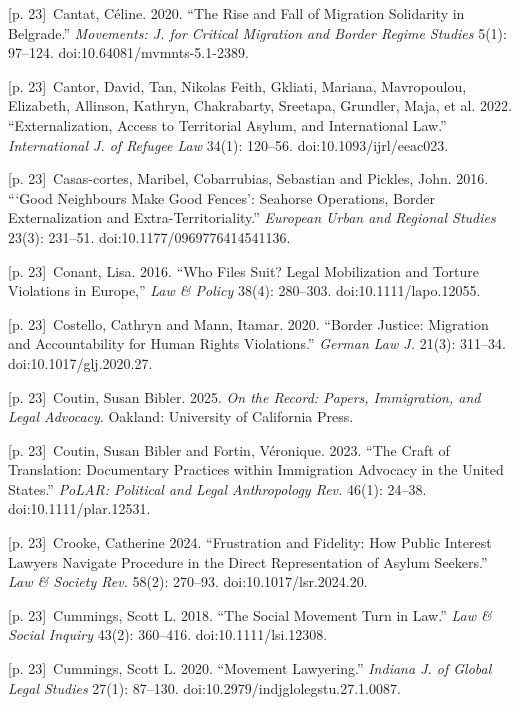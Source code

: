 \documentclass[10pt,a4paper]{article}
\begin{document}
{\scriptsize\color{gray} [p. 23]}\ Cantat, Céline. 2020. “The Rise and Fall of Migration Solidarity in Belgrade.” \textit{Movements: J. for Critical Migration and Border Regime Studies} 5(1): 97–124. doi:10.64081/mvmnts-5.1-2389.\par
{\scriptsize\color{gray} [p. 23]}\ Cantor, David, Tan, Nikolas Feith, Gkliati, Mariana, Mavropoulou, Elizabeth, Allinson, Kathryn, Chakrabarty, Sreetapa, Grundler, Maja, et al. 2022. “Externalization, Access to Territorial Asylum, and International Law.” \textit{International J. of Refugee Law} 34(1): 120–56. doi:10.1093/ijrl/eeac023.\par
{\scriptsize\color{gray} [p. 23]}\ Casas-cortes, Maribel, Cobarrubias, Sebastian and Pickles, John. 2016. “‘Good Neighbours Make Good Fences’: Seahorse Operations, Border Externalization and Extra-Territoriality.” \textit{European Urban and Regional Studies} 23(3): 231–51. doi:10.1177/0969776414541136.\par
{\scriptsize\color{gray} [p. 23]}\ Conant, Lisa. 2016. “Who Files Suit? Legal Mobilization and Torture Violations in Europe,” \textit{Law \& Policy} 38(4): 280–303. doi:10.1111/lapo.12055.\par
{\scriptsize\color{gray} [p. 23]}\ Costello, Cathryn and Mann, Itamar. 2020. “Border Justice: Migration and Accountability for Human Rights Violations.” \textit{German Law J.} 21(3): 311–34. doi:10.1017/glj.2020.27.\par
{\scriptsize\color{gray} [p. 23]}\ Coutin, Susan Bibler. 2025. \textit{On the Record: Papers, Immigration, and Legal Advocacy}. Oakland: University of California Press.\par
{\scriptsize\color{gray} [p. 23]}\ Coutin, Susan Bibler and Fortin, Véronique. 2023. “The Craft of Translation: Documentary Practices within Immigration Advocacy in the United States.” \textit{PoLAR: Political and Legal Anthropology Rev.} 46(1): 24–38. doi:10.1111/plar.12531.\par
{\scriptsize\color{gray} [p. 23]}\ Crooke, Catherine 2024. “Frustration and Fidelity: How Public Interest Lawyers Navigate Procedure in the Direct Representation of Asylum Seekers.” \textit{Law \& Society Rev.} 58(2): 270–93. doi:10.1017/lsr.2024.20.\par
{\scriptsize\color{gray} [p. 23]}\ Cummings, Scott L. 2018. “The Social Movement Turn in Law.” \textit{Law \& Social Inquiry} 43(2): 360–416. doi:10.1111/lsi.12308.\par
{\scriptsize\color{gray} [p. 23]}\ Cummings, Scott L. 2020. “Movement Lawyering.” \textit{Indiana J. of Global Legal Studies} 27(1): 87–130. doi:10.2979/indjglolegstu.27.1.0087.\par
\end{document}
